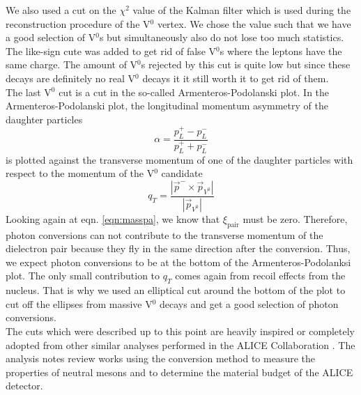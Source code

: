 We also used a cut on the $\chi^2$ value of the Kalman filter which is used during the reconstruction procedure of the V$^0$ vertex. We chose the value such that we have a good selection of V$^0$s but simultaneously also do not lose too much statistics. \\
The like-sign cute was added to get rid of false V$^0$s where the leptons have the same charge. The amount of V$^0$s rejected by this cut is quite low but since these decays are definitely no real V$^0$ decays it it still worth it to get rid of them. \\
The last V$^0$ cut is a cut in the so-called Armenteros-Podolanski plot. In the Armenteros-Podolanski plot, the longitudinal momentum asymmetry of the daughter particles
\begin{equation}
\alpha = \frac{p_L^{+} - p_L^{-}}{p_L^{+} + p_L^{-}}
\end{equation}
is plotted against the transverse momentum of one of the daughter particles with respect to the momentum of the V$^0$ candidate
\begin{equation}
q_T = \frac{|\vec{p}^{-} \times \vec{p}_{V^0}|}{|\vec{p}_{V^0}|}
\end{equation}
Looking again at eqn. \ref{eqn:masspa}, we know that $\xi_{\mathrm{pair}}$ must be zero. Therefore, photon conversions can not contribute to the transverse momentum of the dielectron pair because they fly in the same direction after the conversion. Thus, we expect photon conversions to be at the bottom of the Armenteros-Podolanksi plot. The only small contribution to $q_T$ comes again from recoil effects from the nucleus. That is why we used an elliptical cut around the bottom of the plot to cut off the ellipses from massive V$^0$ decays and get a good selection of photon conversions. \\
The cuts which were described up to this point are heavily inspired or completely adopted from other similar analyses performed in the ALICE Collaboration \cite{ananote1, ananote2}. The analysis notes review works using the conversion method to measure the properties of neutral mesons and to determine the material budget of the ALICE detector. \\

